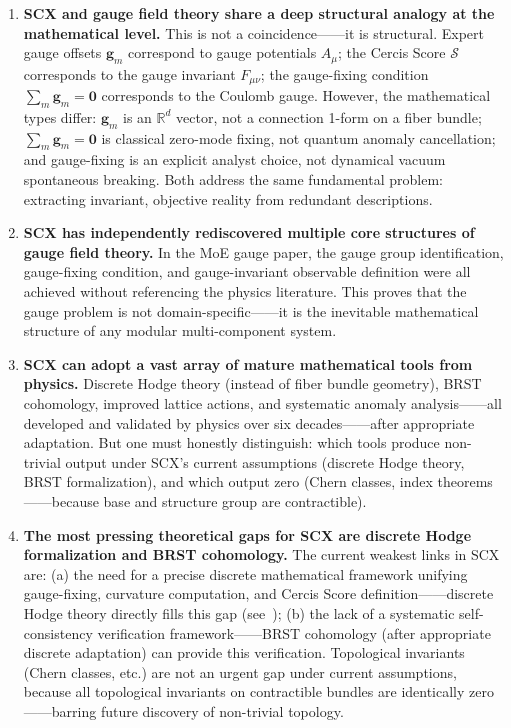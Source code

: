 \documentclass[12pt,a4paper]{article}
\theoremstyle{remark}
\newcommand{\R}{\mathbb{R}}
\newcommand{\CercisScore}{\mathcal{S}}
\newcommand{\gaugeparam}{\mathbf{g}}
\begin{document}
\medskip

\begin{enumerate}[label=\textbf{(F\arabic*)}]
    \item \textbf{SCX and gauge field theory share a deep structural analogy at the mathematical level.}
    This is not a coincidence——it is structural. Expert gauge offsets $\gaugeparam_m$
    correspond to gauge potentials $A_\mu$; the Cercis Score $\CercisScore$ corresponds to the gauge invariant $F_{\mu\nu}$;
    the gauge-fixing condition $\sum_m \gaugeparam_m = \mathbf{0}$ corresponds to the Coulomb gauge.
    However, the mathematical types differ: $\gaugeparam_m$ is an $\R^d$ vector, not a connection 1-form on a fiber bundle;
    $\sum_m \gaugeparam_m = \mathbf{0}$ is classical zero-mode fixing, not quantum anomaly cancellation;
    and gauge-fixing is an explicit analyst choice, not dynamical vacuum spontaneous breaking.
    Both address the same fundamental problem: extracting invariant, objective reality from
    redundant descriptions.
    \\[2pt]

    \item \textbf{SCX has independently rediscovered multiple core structures of gauge field theory.}
    In the MoE gauge paper, the gauge group identification, gauge-fixing condition,
    and gauge-invariant observable definition were all
    achieved without referencing the physics literature. This proves that the
    gauge problem is not domain-specific——it is the inevitable mathematical
    structure of any modular multi-component system.
    \\[2pt]

    \item \textbf{SCX can adopt a vast array of mature mathematical tools from physics.}
    Discrete Hodge theory (instead of fiber bundle geometry), BRST cohomology,
    improved lattice actions, and systematic anomaly analysis——all developed
    and validated by physics over six decades——after appropriate adaptation.
    But one must honestly distinguish: which tools produce non-trivial output
    under SCX's current assumptions (discrete Hodge theory, BRST formalization),
    and which output zero (Chern classes, index theorems——because base and
    structure group are contractible).
    \\[2pt]

    \item \textbf{The most pressing theoretical gaps for SCX are discrete Hodge formalization and BRST cohomology.}
    The current weakest links in SCX are: (a) the need for a precise discrete mathematical framework unifying gauge-fixing,
    curvature computation, and Cercis Score definition——discrete Hodge theory directly fills this gap (see~\cite{scx_fiber_bundle});
    (b) the lack of a systematic self-consistency verification framework——BRST cohomology (after appropriate discrete adaptation)
    can provide this verification. Topological invariants (Chern classes, etc.) are not an urgent gap under current assumptions,
    because all topological invariants on contractible bundles are identically zero——barring future discovery of non-trivial topology.


\end{enumerate}
\end{document}

